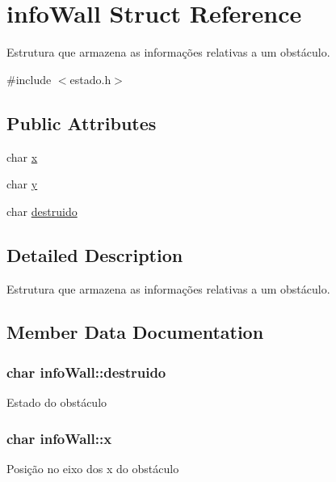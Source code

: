 \hypertarget{structinfoWall}{}\section{info\+Wall Struct Reference}
\label{structinfoWall}


Estrutura que armazena as informações relativas a um obstáculo.  




{\ttfamily \#include $<$estado.\+h$>$}

\subsection*{Public Attributes}
\begin{DoxyCompactItemize}
\item 
char \hyperlink{structinfoWall_ab8550ac8cb4423531202c5b01f9552c7}{x}
\item 
char \hyperlink{structinfoWall_ab6a0a98ec8849197d2d5e191e84a9303}{y}
\item 
char \hyperlink{structinfoWall_aaad9cc177af38ea41a73287cdd5f3790}{destruido}
\end{DoxyCompactItemize}


\subsection{Detailed Description}
Estrutura que armazena as informações relativas a um obstáculo. 

\subsection{Member Data Documentation}
\subsubsection[{\texorpdfstring{destruido}{destruido}}]{\setlength{\rightskip}{0pt plus 5cm}char info\+Wall\+::destruido}\hypertarget{structinfoWall_aaad9cc177af38ea41a73287cdd5f3790}{}\label{structinfoWall_aaad9cc177af38ea41a73287cdd5f3790}
Estado do obstáculo 
\subsubsection[{\texorpdfstring{x}{x}}]{\setlength{\rightskip}{0pt plus 5cm}char info\+Wall\+::x}\hypertarget{structinfoWall_ab8550ac8cb4423531202c5b01f9552c7}{}\label{structinfoWall_ab8550ac8cb4423531202c5b01f9552c7}
Posição no eixo dos x do obstáculo 
